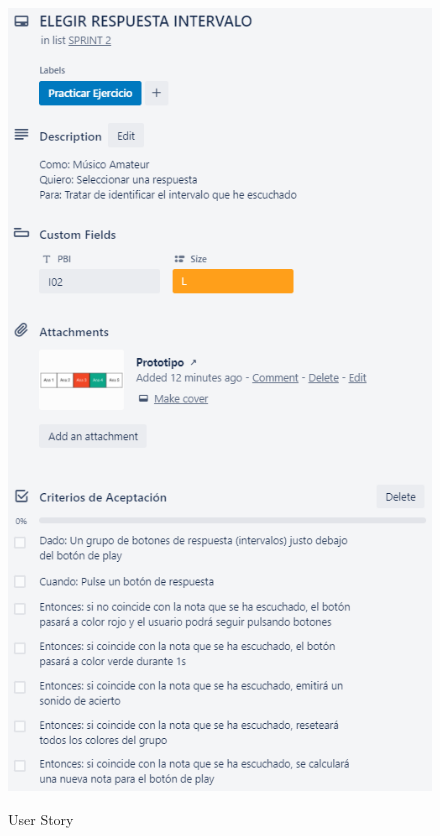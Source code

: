 \documentclass[12pt,twoside,titlepage]{report}
\begin{document}
\begin{figure}[H]
    \centering
    \includegraphics[scale=1.3]{Scrum/User Stories/IntervalosRespuestas}
    \label{fig:IntervalosRespuestas}
    \caption{User Story}
\end{figure}
\end{document}
